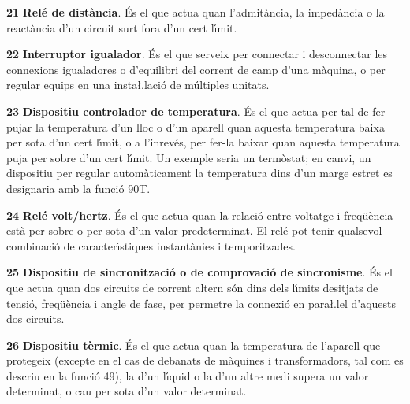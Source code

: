 \begin{multicols}{2}
\begin{list}{}
\item[\textbf{21}]   
\textbf{Rel\'{e} de dist\`{a}ncia}. \'{E}s el que actua
quan l'admit\`{a}ncia, la imped\`{a}ncia o la react\`{a}ncia d'un circuit surt fora d'un cert l\'{\i}mit.

\item[\textbf{22}]   
\textbf{Interruptor igualador}.  \'{E}s el
que serveix per connectar i desconnectar les connexions igualadores
o d'equilibri del corrent de camp d'una m\`{a}quina, o per regular
equips en una  insta{\l.l}aci\'{o} de  m\'{u}ltiples unitats.

\item[\textbf{23}]   
\textbf{Dispositiu controlador de temperatura}. \'{E}s el que actua per tal de fer pujar la
temperatura d'un lloc o d'un aparell quan aquesta temperatura baixa
per sota d'un cert l\'{\i}mit, o a l'inrev\'{e}s, per fer-la baixar quan aquesta
temperatura  puja per sobre d'un cert l\'{\i}mit. Un exemple seria un
term\`{o}stat; en canvi, un dispositiu per regular autom\`{a}ticament la temperatura dins
d'un marge estret es designaria amb la funci\'{o} 90T.

\item[\textbf{24}]  
 \textbf{Rel\'{e} volt/hertz}.
\'{E}s el que actua quan la relaci\'{o}  entre voltatge i freq\"{u}\`{e}ncia est\`{a} per sobre o  per sota d'un valor predeterminat. El rel\'{e} pot tenir qualsevol combinaci\'{o} de caracter\'{\i}stiques instant\`{a}nies i temporitzades.

\item[\textbf{25}]   
\textbf{Dispositiu de sincronitzaci\'{o} o de comprovaci\'{o}
de sincronisme}. \'{E}s el que actua quan dos circuits de corrent altern
s\'{o}n dins dels l\'{\i}mits desitjats de tensi\'{o}, freq\"{u}\`{e}ncia i angle de
fase, per permetre la connexi\'{o} en para{\l.l}el d'aquests dos circuits.


\item[\textbf{26}]    
\textbf{Dispositiu t\`{e}rmic}. \'{E}s el que
actua quan la temperatura de l'aparell que protegeix (excepte en el cas de debanats de m\`{a}quines i transformadors, tal com es descriu en la funci\'{o} 49), la d'un l\'{\i}quid o la d'un altre medi  supera un valor
determinat, o cau per sota d'un valor determinat.



\end{list}
\end{multicols}
